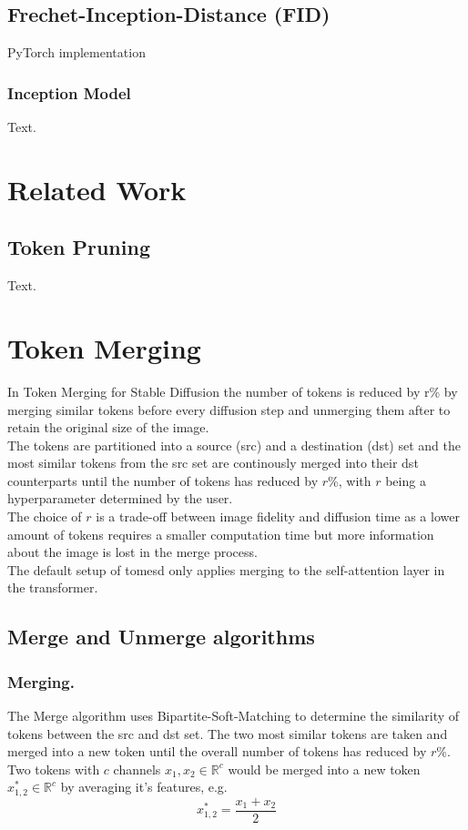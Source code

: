 \documentclass{article}
\begin{document}
\subsection{Frechet-Inception-Distance (FID)}
PyTorch implementation \cite{Seitzer2020FID}

\subsubsection{Inception Model}
Text.





\newpage
\section{Related Work}

\subsection{Token Pruning}
Text.





\newpage
\section{Token Merging}
In Token Merging for Stable Diffusion\cite{bolya2023tomesd} the number of tokens is reduced by r\% by merging similar tokens before every diffusion step and unmerging them after to retain the original size of the image.\\ The tokens are partitioned into a source (src) and a destination (dst) set and the most similar tokens from the src set are continously merged into their dst counterparts until the number of tokens has reduced by \(r\)\%, with \(r\) being a hyperparameter determined by the user.\\ The choice of \(r\) is a trade-off between image fidelity and diffusion time as a lower amount of tokens requires a smaller computation time but more information about the image is lost in the merge process.\\
The default setup of tomesd\cite{bolya2023tomesd} only applies merging to the self-attention layer in the transformer.

\subsection{Merge and Unmerge algorithms}
\subsubsection*{Merging.} The Merge algorithm uses Bipartite-Soft-Matching to determine the similarity of tokens between the src and dst set. The two most similar tokens are taken and merged into a new token until the overall number of tokens has reduced by \(r\)\%.\\
Two tokens with \(c\) channels \(x_1, x_2 \in \mathbb{R}^c\) would be merged into a new token \(x_{1,2}^* \in \mathbb{R}^c \) by averaging it's features, e.g. \[x_{1,2}^* = \frac{x_1 + x_2}{2}\]
\end{document}
